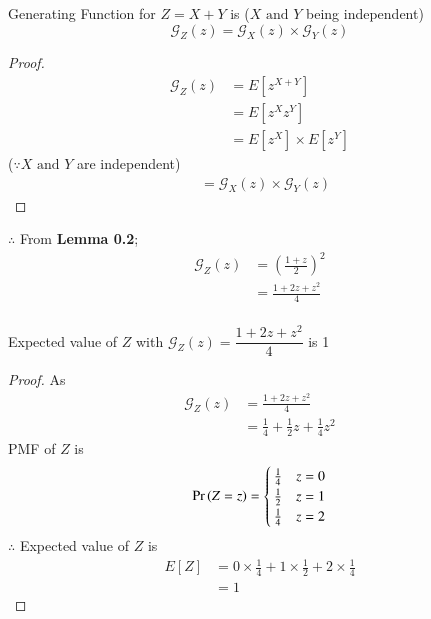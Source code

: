 \documentclass[journal,12pt,twocolumn]{IEEEtran}
\begin{document}
\begin{lemma}
Generating Function for $Z=X+Y$ is ($X \text{ and } Y$ being independent) $$\mathcal{G}_Z(z)=\mathcal{G}_X(z) \times \mathcal{G}_Y(z)$$ 
\end{lemma}
\begin{proof}
 \begin{align}
  \mathcal{G}_Z(z) &= E[z^{X+Y}]\\
                   &= E[z^X z^Y]\\
                   &= E[z^X]\times E[z^Y]
\end{align}
($\because X \text{ and } Y$ are independent)
\begin{align}
    &= \mathcal{G}_X(z) \times \mathcal{G}_Y(z)
\end{align}
\end{proof}
 $\therefore$ From \textbf{Lemma 0.2};
\begin{align}
\mathcal{G}_Z(z) &=\left(\frac{1 + z}{2}\right)^2\\
                   &= \frac{1+2z+z^2}{4}\\
\end{align}
\begin{lemma}
Expected value of $Z$ with $\mathcal{G}_Z(z) = \dfrac{1+2z+z^2}{4}$ is 1 
\end{lemma}
\begin{proof}
 As
 \begin{align}
     \mathcal{G}_Z(z) &= \frac{1+2z+z^2}{4}\\
                      &= \frac{1}{4} + \frac{1}{2}z + \frac{1}{4}z^2
 \end{align}
 PMF of $Z$ is
 \begin{align}
    \Pr\left(Z = z\right) = 
\begin{cases}
\frac{1}{4} & z=0
\\
\frac{1}{2} & z=1\\
\frac{1}{4} & z=2
\end{cases}\label{2}
\end{align}
$\therefore$ Expected value of $Z$ is
\begin{align}
   E[Z] &= 0\times\frac{1}{4} + 1\times\frac{1}{2} + 2\times\frac{1}{4}\\
                     &= 1
\end{align}
\end{proof}
\end{document}
